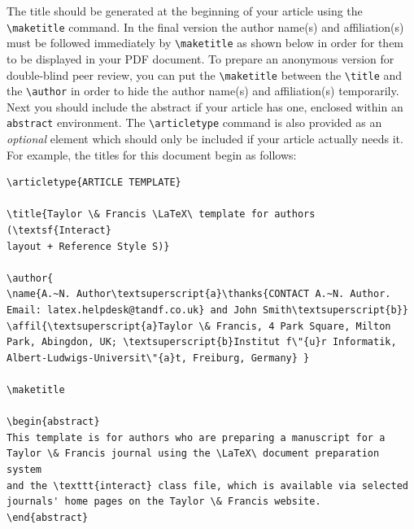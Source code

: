 \documentclass[]{interact}
\theoremstyle{plain}%
\theoremstyle{definition}
\theoremstyle{remark}
\begin{document}
The title should be generated at the beginning of your article using the \verb"\maketitle" command.
In the final version the author name(s) and affiliation(s) must be followed immediately by \verb"\maketitle" as shown below in order for them to be displayed in your PDF document.
To prepare an anonymous version for double-blind peer review, you can put the \verb"\maketitle" between the \verb"\title" and the \verb"\author" in order to hide the author name(s) and affiliation(s) temporarily.
Next you should include the abstract if your article has one, enclosed within an \texttt{abstract} environment.
The \verb"\articletype" command is also provided as an \emph{optional} element which should only be included if your article actually needs it.
For example, the titles for this document begin as follows:
\begin{verbatim}
\articletype{ARTICLE TEMPLATE}

\title{Taylor \& Francis \LaTeX\ template for authors (\textsf{Interact}
layout + Reference Style S)}

\author{
\name{A.~N. Author\textsuperscript{a}\thanks{CONTACT A.~N. Author.
Email: latex.helpdesk@tandf.co.uk} and John Smith\textsuperscript{b}}
\affil{\textsuperscript{a}Taylor \& Francis, 4 Park Square, Milton
Park, Abingdon, UK; \textsuperscript{b}Institut f\"{u}r Informatik,
Albert-Ludwigs-Universit\"{a}t, Freiburg, Germany} }

\maketitle

\begin{abstract}
This template is for authors who are preparing a manuscript for a
Taylor \& Francis journal using the \LaTeX\ document preparation system
and the \texttt{interact} class file, which is available via selected
journals' home pages on the Taylor \& Francis website.
\end{abstract}
\end{verbatim}
\end{document}
